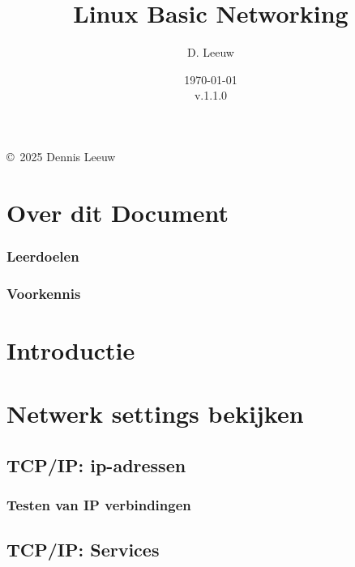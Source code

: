 \documentclass[a4paper,12pt,twoside,openright,titlepage]{book}
\author{D. Leeuw}
\title{Linux Basic Networking}
\date{\today\\v.1.1.0}
\begin{document}

\maketitle

\copyright\ 2025 Dennis Leeuw\\




\frontmatter
\chapter{Over dit Document}
\subsection{Leerdoelen}

\subsection{Voorkennis}



\tableofcontents

\mainmatter


\chapter{Introductie}


\chapter{Netwerk settings bekijken}

\section{TCP/IP: ip-adressen}

\subsection{Testen van IP verbindingen}


\section{TCP/IP: Services}
\end{document}
